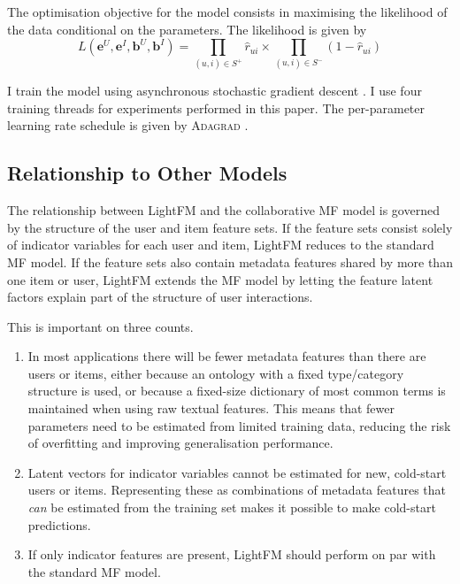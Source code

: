 \documentclass{sig-alternate}
\newcommand\symUserInteractionSet{S}
\begin{document}
The optimisation objective for the model consists in maximising the likelihood of the data conditional on the parameters. The likelihood is given by
\begin{equation}
L\left(\boldsymbol{e}^U, \boldsymbol{e}^I, \boldsymbol{b}^U, \boldsymbol{b}^I\right) = \prod_{(u, i) \in \symUserInteractionSet^+} \widehat{r}_{ui} \times \prod_{(u, i) \in \symUserInteractionSet^-} (1 - \widehat{r}_{ui})
\end{equation}

I train the model using asynchronous stochastic gradient descent \cite{recht2011hogwild}. I use four training threads for experiments performed in this paper. The per-parameter learning rate schedule is given by \textsc{Adagrad} \cite{duchi2011adaptive}.

\subsection{Relationship to Other Models}
The relationship between LightFM and the collaborative MF model is governed by the structure of the user and item feature sets. If the feature sets consist solely of indicator variables for each user and item, LightFM reduces to the standard MF model. If the feature sets also contain metadata features shared by more than one item or user, LightFM extends the MF model by letting the feature latent factors explain part of the structure of user interactions.

This is important on three counts. 
\begin{enumerate}
\item In most applications there will be fewer metadata features than there are users or items, either because an ontology with a fixed type/category structure is used, or because a fixed-size dictionary of most common terms is maintained when using raw textual features. This means that fewer parameters need to be estimated from limited training data, reducing the risk of overfitting and improving generalisation performance.
\item Latent vectors for indicator variables cannot be estimated for new, cold-start users or items. Representing these as combinations of metadata features that \emph{can} be estimated from the training set makes it possible to make cold-start predictions.
\item If only indicator features are present, LightFM should perform on par with the standard MF model.
\end{enumerate}
\end{document}
